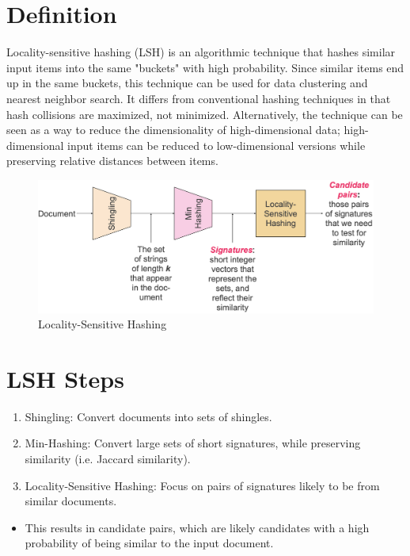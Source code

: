 \section{Definition}

Locality-sensitive hashing (LSH) is an algorithmic technique that hashes 
similar input items into the same "buckets" with high probability. 
Since similar items end up in the same buckets, this technique can be used for 
data clustering and nearest neighbor search. 
It differs from conventional hashing techniques in that hash collisions are maximized, 
not minimized. Alternatively, the technique can be seen as a way to reduce the dimensionality of high-dimensional data; high-dimensional input items can be reduced to low-dimensional versions while preserving relative distances between items.


\bigskip
\begin{figure}[H]
 \centering
 \includegraphics[scale=0.35]{figures/lsh.png}
 \caption{Locality-Sensitive Hashing}
\end{figure}


\section{LSH Steps}
\begin{enumerate}
 \item Shingling: Convert documents into sets of shingles.
 \item Min-Hashing: Convert large sets of short signatures, while preserving similarity (i.e. Jaccard similarity).
 \item Locality-Sensitive Hashing: Focus on pairs of signatures likely to be from similar documents.
\end{enumerate}
\begin{itemize}
 \item This results in candidate pairs, which are likely candidates with a high probability of being similar to the input document.
\end{itemize}

